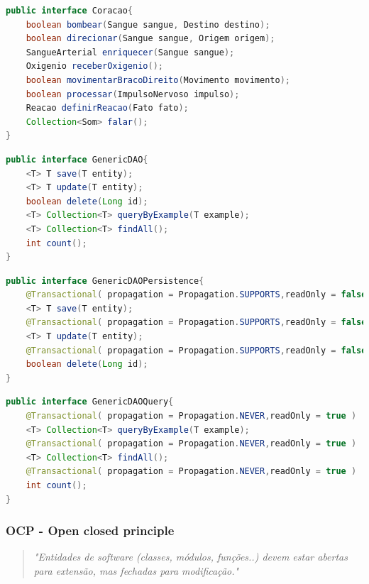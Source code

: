 \documentclass[12pt]{article}
\begin{document}

\begin{lstlisting}[caption=Exemplo de violação ao SRP,language=java]
public interface Coracao{
	boolean bombear(Sangue sangue, Destino destino);
	boolean direcionar(Sangue sangue, Origem origem);
	SangueArterial enriquecer(Sangue sangue);
	Oxigenio receberOxigenio();
	boolean movimentarBracoDireito(Movimento movimento);
	boolean processar(ImpulsoNervoso impulso);
	Reacao definirReacao(Fato fato);
	Collection<Som> falar();
}
\end{lstlisting}

\begin{lstlisting}[caption=Exemplo 2.1 de conformidade ao SRP,language=java]
public interface GenericDAO{
	<T> T save(T entity);
	<T> T update(T entity);
	boolean delete(Long id);
	<T> Collection<T> queryByExample(T example);
	<T> Collection<T> findAll();
	int count();
}
\end{lstlisting}

\begin{lstlisting}[caption=Exemplo 2.2.1 de conformidade ao SRP,language=java]
public interface GenericDAOPersistence{
	@Transactional( propagation = Propagation.SUPPORTS,readOnly = false )
	<T> T save(T entity);
	@Transactional( propagation = Propagation.SUPPORTS,readOnly = false )
	<T> T update(T entity);
	@Transactional( propagation = Propagation.SUPPORTS,readOnly = false )
	boolean delete(Long id);
}
\end{lstlisting}
\begin{lstlisting}[caption=Exemplo 2.2.2 de conformidade ao SRP,language=java]
public interface GenericDAOQuery{
	@Transactional( propagation = Propagation.NEVER,readOnly = true )
	<T> Collection<T> queryByExample(T example);
	@Transactional( propagation = Propagation.NEVER,readOnly = true )
	<T> Collection<T> findAll();
	@Transactional( propagation = Propagation.NEVER,readOnly = true )
	int count();
}
\end{lstlisting}

\subsubsection{OCP - Open closed principle}

\begin{quote}
	\textit{"Entidades de software (classes, módulos, funções..) devem estar abertas para extensão, mas fechadas para modificação."}
\end{quote}
\end{document}
